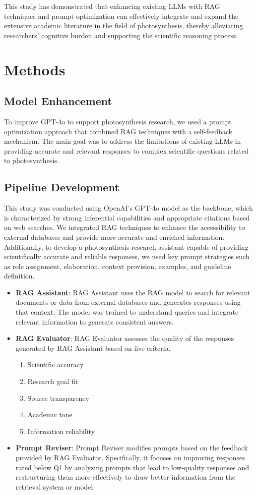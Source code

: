 \documentclass[12pt]{article}
\begin{document}
This study has demonstrated that enhancing existing LLMs with RAG techniques and prompt optimization can effectively integrate and expand the extensive academic literature in the field of photosynthesis, thereby alleviating researchers' cognitive burden and supporting the scientific reasoning process.

\section{Methods}
\subsection{Model Enhancement}
To improve GPT-4o to support photosynthesis research, we used a prompt optimization approach that combined RAG techniques with a self-feedback mechanism. The main goal was to address the limitations of existing LLMs in providing accurate and relevant responses to complex scientific questions related to photosynthesis.

\subsection{Pipeline Development}
This study was conducted using OpenAI's GPT-4o model as the backbone, which is characterized by strong inferential capabilities and appropriate citations based on web searches. We integrated RAG techniques to enhance the accessibility to external databases and provide more accurate and enriched information. Additionally, to develop a photosynthesis research assistant capable of providing scientifically accurate and reliable responses, we used key prompt strategies such as role assignment, elaboration, context provision, examples, and guideline definition.

\begin{itemize}
    \item \textbf{RAG Assistant}: RAG Assistant uses the RAG model to search for relevant documents or data from external databases and generates responses using that context. The model was trained to understand queries and integrate relevant information to generate consistent answers.
    \item \textbf{RAG Evaluator}: RAG Evaluator assesses the quality of the responses generated by RAG Assistant based on five criteria.
    \begin{enumerate}
        \item Scientific accuracy
        \item Research goal fit
        \item Source transparency
        \item Academic tone
        \item Information reliability
    \end{enumerate}
    \item \textbf{Prompt Reviser}: Prompt Reviser modifies prompts based on the feedback provided by RAG Evaluator. Specifically, it focuses on improving responses rated below Q1 by analyzing prompts that lead to low-quality responses and restructuring them more effectively to draw better information from the retrieval system or model.
\end{itemize}
\end{document}

